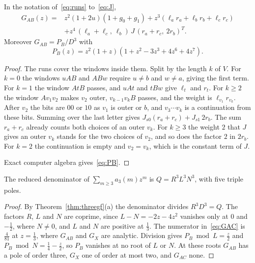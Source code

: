 \begin{proposition}\label{prop:GAB}
In the notation of~\eqref{eq:runs} to~\eqref{eq:J},
\begin{equation}\label{eq:GAB}
\begin{aligned}
G_{AB}(z)={}&z^2(1+2u)(1+g_0+g_1)+z^3(\ell_ar_a+\ell_br_b+\ell_cr_c)\\
&+z^4\,(\ell_a+\ell_c,\ \ell_b)\,J\,(r_a+r_c,\ 2r_b)^{T}.
\end{aligned}
\end{equation}
Moreover $G_{AB}=P_B/D^3$ with
\begin{equation}\label{eq:PB}
P_B(z)=z^2(1+z)(1+z^2-3z^3+4z^6+4z^7).
\end{equation}
\end{proposition}

\begin{proof}
The runs cover the windows inside them. Split by the length $k$ of $V$. For $k=0$ the windows
$uAB$ and $ABw$ require $u\ne b$ and $w\ne a$, giving the first term. For $k=1$ the window $AtB$ passes, and $uAt$ and $tBw$
give $\ell_t$ and $r_t$. For $k\ge2$ the window $Av_1v_2$ makes $v_2$ outer, $v_{k-1}v_kB$ passes,
and the weight is $\ell_{v_1}r_{v_k}$. After $v_2$ the bits are $00$ or $10$ as $v_1$ is outer or
$b$, and $v_3\cdots v_k$ is a continuation from these bits. Summing over the last letter gives
$J_{s0}(r_a+r_c)+J_{s1}\,2r_b$. The sum $r_a+r_c$ already counts both choices of an outer
$v_k$. For $k\ge3$ the weight $2$ that $J$ gives an outer $v_k$ stands for the two choices of
$v_2$, and so does the factor $2$ in $2r_b$. For $k=2$ the continuation is empty and
$v_2=v_k$, which is the constant term of $J$.

Exact computer algebra gives~\eqref{eq:PB}.
\end{proof}

\begin{theorem}\label{thm:denominator}
The reduced denominator of $\sum_{m\ge3}a_3(m)z^m$ is $Q=R^3L^3N^3$, with five triple poles.
\end{theorem}

\begin{proof}
By Theorem~\ref{thm:threegf}(a) the denominator divides $R^3D^3=Q$. The factors $R$, $L$ and
$N$ are coprime, since $L-N=-2z-4z^2$ vanishes only at $0$ and $-\frac12$, where $N\ne0$, and
$L$ and $N$ are positive at $\frac13$. The numerator in~\eqref{eq:GAC} is $\frac4{81}$ at
$z=\frac13$, where $G_{AB}$ and $G_X$ are analytic. Division gives $P_B\bmod L=\frac z2$ and
$P_B\bmod N=\frac14-\frac z2$, so $P_B$ vanishes at no root of $L$ or $N$. At these roots $G_{AB}$ has a
pole of order three, $G_X$ one of order at most two, and $G_{AC}$ none.
\end{proof}

